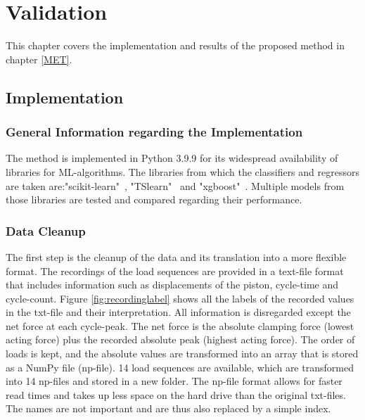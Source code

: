 \chapter{Validation}\label{Validation}
This chapter covers the implementation and results of the proposed method in chapter \ref{MET}.

\section{Implementation}
\subsection{General Information regarding the Implementation}
The method is implemented in Python 3.9.9 for its widespread availability of libraries for ML-algorithms.
The libraries from which the classifiers and regressors are taken are:\newline "scikit-learn"~\cite{SKlearn}, "TSlearn"~\cite{tslearn} and "xgboost"~\cite{XG}.
Multiple models from those libraries are tested and compared regarding their performance. %
\subsection{Data Cleanup}
The first step is the cleanup of the data and its translation into a more flexible format. The recordings of the load sequences are provided in a text-file format that includes information such as displacements of the piston, cycle-time and cycle-count.
Figure \ref{fig:recordinglabel} shows all the labels of the recorded values in the txt-file and their interpretation. All information is disregarded except the net force at each cycle-peak. The net force is the absolute clamping force (lowest acting force) plus the recorded absolute peak (highest acting force). The order of loads is kept, and the absolute values are transformed into an array that is stored as a NumPy file (np-file). 14 load sequences are available, which are transformed into 14 np-files and stored in a new folder. The np-file format allows for faster read times and takes up less space on the hard drive than the original txt-files. The names are not important and are thus also replaced by a simple index.


